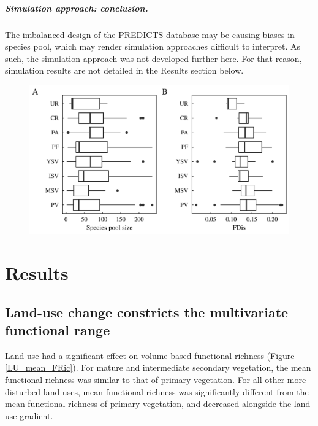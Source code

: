 \subparagraph{Simulation approach: conclusion.} The imbalanced design of the PREDICTS database may be causing biases in species pool, which may render simulation approaches difficult to interpret. As such, the simulation approach was not developed further here. For that reason, simulation results are not detailed in the Results section below.

\begin{figure}[h!]
\centering
\includegraphics[scale=0.70]{figures/chapter3/Simulations/pool_species_FDis}
\caption[]{\textbf{}}
\label{speciespool}
\end{figure}


\pagebreak
\section{Results}

\subsection{Land-use change constricts the multivariate functional range}
Land-use had a significant effect on volume-based functional richness (Figure \ref{LU_mean_FRic}). For mature and intermediate secondary vegetation, the mean functional richness was similar to that of primary vegetation. For all other more disturbed land-uses, mean functional richness was significantly different from the mean functional richness of primary vegetation, and decreased alongside the land-use gradient. 

